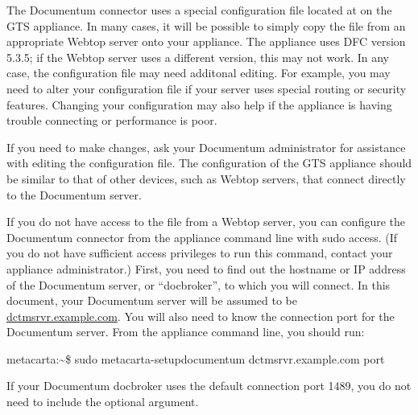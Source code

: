 %
%

The Documentum connector uses a special configuration file located at
 on the GTS appliance.  In many cases,
it will be possible to simply copy the  file from an
appropriate Webtop server onto your appliance. The appliance uses DFC
version 5.3.5; if the Webtop server uses a different version, this may not
work. In any case, the configuration file may need additonal editing. For
example, you may need to alter your configuration file if your server uses
special routing or security features. Changing your configuration may also
help if the appliance is having trouble connecting or performance is poor.

If you need to make changes, ask your Documentum administrator for
assistance with editing the configuration file.  The configuration of
the GTS appliance should be similar to that of other devices, such as
Webtop servers, that connect directly to the Documentum server.

If you do not have access to the  file from a
Webtop server, you can configure the Documentum connector from
the appliance command line with sudo access. (If you do not have
sufficient access privileges to run this command, contact your
appliance administrator.)  First, you need to find out the hostname or
IP address of the Documentum server, or ``docbroker'', to which you will
connect. In this document, your Documentum server will be assumed to be
\url{dctmsrvr.example.com}. You will also need to know the connection
port for the Documentum server. From the appliance command line, you
should run:

\begin{consolewide}
metacarta:\~{}\$ sudo metacarta-setupdocumentum dctmsrvr.example.com port
\end{consolewide}

If your Documentum docbroker uses the default connection port 1489,
you do not need to include the optional  argument.
